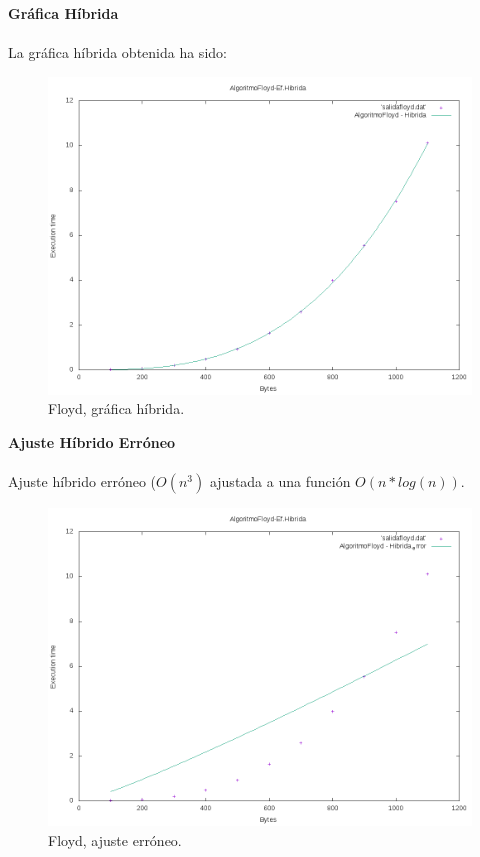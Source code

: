 \textbf{Gráfica Híbrida}\\
\\
La gráfica híbrida obtenida ha sido:
\begin{figure}[H]
	\centering
	\includegraphics[scale=0.5]{imagenes/algoritmoFloyd-hibrida.png}
	\caption{Floyd, gráfica híbrida.}
	\label{fig:E17}
\end{figure}


\textbf{Ajuste Híbrido Erróneo}\\
\\

Ajuste híbrido erróneo ($O(n^3)$ ajustada a una función $O(n * log(n))$.
\begin{figure}[H]
	\centering
	\includegraphics[scale=0.5]{imagenes/FloydError.png}
	\caption{Floyd, ajuste erróneo.}
	\label{fig:E18}
\end{figure}


